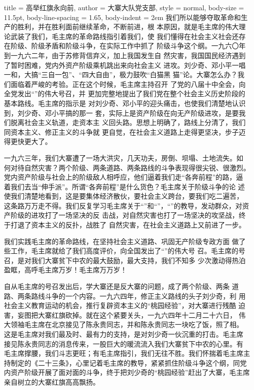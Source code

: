 \begin{hongqiarticle}{
        title  = {高举红旗永向前},
        author = {大寨大队党支部},
        style  = normal,
        body-size = 11.5pt,
        body-line-spacing = 1.65,
        body-indent = 2em
    }
    我们所以能够夺取革命和生产的胜利，并在胜利面前继续革命，不断前进，根
    本原因，就是毛主席的伟大理论武装了我们，毛主席的革命路线指引着我们，使
    我们懂得在社会主义社会还存在阶级、阶级矛盾和阶级斗争，在实际工作中抓了
    阶级斗争这个纲。一九六〇年到一九六二年，由于苏修背信弃义，加上我国发生自
    然灾害，我国国民经济遇到了暂时困难，党内外资产阶级乘机跳出来向社会主义
    进攻。刘少奇、邓小平一唱一和，大搞“三自一包”、“四大自由”，极力鼓吹“白猫黑
    猫”论。大寨怎么办？我们面临着严峻的考验。正在这个时候，毛主席主持召开
    了党的八届十中全会，向全党发出“”的伟大号召，并
    更加完整地提出了我们党在整个社会主义历史阶段的基本路线。毛主席的指示是
    对刘少奇、邓小平的迎头痛击，也使我们清楚地认识到，刘少奇、邓小平搞的那一
    套，实际上是资产阶级在向无产阶级进攻，是要我们脱离社会主义轨道，走资本主
    义回头路。思想上明确了，路线上分清了，我们同资本主义、修正主义的斗争就
    更自觉，在社会主义道路上走得更坚决，步子迈得更快更大了。
    
    一九六三年，我们大寨遭了一场大洪灾，几天功夫，房倒、坝塌、土地流失。如
    何对待自然灾害？两个阶级、两条道路、两条路线的斗争表现得很尖锐、很激烈。
    党内资产阶级与社会上的阶级敌人相呼应，他们逼着我们走“各奔前程”的路，逼
    着我们去当“伸手派”。所谓“各奔前程”是什么货色？毛主席关于阶级斗争的论
    述使我们清楚地看到，这是要集体经济散伙，要社会主义跨台，要我们吃二遍苦，
    这条路万万走不得。我们反复学习毛主席关于“”和“”，“”的教导，发动群众，对资产阶级的进攻打了一场坚决的反
    击战，对自然灾害也打了一场坚决的攻坚战，终于打退了资本主义的反扑，战胜了
    自然灾害，在社会主义道路上又前进了一步。
    
    我们实践毛主席的革命路线，在坚持社会主义道路、巩固无产阶级专政方面
    做了些工作，毛主席就给了我们高度评价，向全国发出了“”的伟大号
    召。毛主席的号召，是对我们大寨贫下中农的最大鼓励，最大支持，我们不知多
    少次激动得热泊盈眶，高呼毛主席万岁！毛主席万万岁！
    
    自从毛主席的号召发出后，学大寨还是反大寨的问题，成了两个阶级、两条
    道路、两条路线斗争的一个内容。一九六四年，修正主义路线的头子刘少奇，利
    用社会主义教育运动的机会，推行复辟资本主义的“桃园经验”，对大寨进行残酷
    迫害，妄图把大寨红旗砍掉。就在这个紧要关头，一九六四年十二月二十六日，
    伟大领袖毛主席在北京接见了陈永贵同志，并和陈永贵同志一块吃了饭，照了相。
    这是毛主席对我们最及时、最有力的支持，是对刘少奇一伙沉重的打击。毛主席
    接见陈永贵同志的消息传来，一股巨大的暖流流入我们大寨贫下中农的心里。有
    毛主席撑腰，我们斗志更旺；有毛主席指引，我们无往不胜。我们怀揣着毛主席主
    持制定的《二十三条》，心里记着毛主席的教导，紧紧抓住阶级斗争这个纲，同党
    内资产阶级开展了面对面的斗争，终于把刘少奇的“桃园经验”赶出了大寨，毛主席
    亲自树立的大寨红旗高高飘扬。
    

\end{hongqiarticle}
